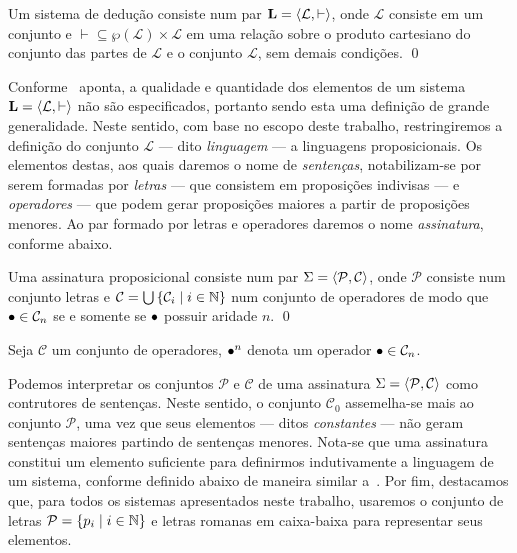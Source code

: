 \begin{definition}[Sistema]
    Um sistema de dedução consiste num par $\mathbf{L} = \langle\mathcal{L}, \vdash\rangle$, onde $\mathcal{L}$ consiste em um conjunto e ${\vdash}\subseteq\wp(\mathcal{L})\times\mathcal{L}$ em uma relação sobre o produto cartesiano do conjunto das partes de $\mathcal{L}$ e o conjunto $\mathcal{L}$, sem demais condições.
    \qed{}
\end{definition}

Conforme~\cite{Beziau} aponta, a qualidade e quantidade dos elementos de um sistema $\mathbf{L}=\langle\mathcal{L}, \vdash\rangle$ não são especificados, portanto sendo esta uma definição de grande generalidade. Neste sentido, com base no escopo deste trabalho, restringiremos a definição do conjunto $\mathcal{L}$ --- dito \emph{linguagem} --- a linguagens proposicionais. Os elementos destas, aos quais daremos o nome de \emph{sentenças}, notabilizam-se por serem formadas por \emph{letras} --- que consistem em proposições indivisas --- e \emph{operadores} --- que podem gerar proposições maiores a partir de proposições menores. Ao par formado por letras e operadores daremos o nome \emph{assinatura}, conforme abaixo.

\begin{definition}[Assinatura]
    Uma assinatura proposicional consiste num par $\Sigma=\langle\mathcal{P},\mathcal{C}\rangle$, onde $\mathcal{P}$ consiste num conjunto letras e $\mathcal{C}=\bigcup\left\{\mathcal{C}_i\mid i\in\mathbb{N}\right\}$ num conjunto de operadores de modo que $\mathalpha{\bullet}\in\mathcal{C}_n$ se e somente se $\mathalpha{\bullet}$ possuir aridade $n$.
    \qed{}
\end{definition}

\begin{notation}
    Seja $\mathcal{C}$ um conjunto de operadores, $\mathalpha{\bullet}^n$ denota um operador $\mathalpha{\bullet}\in\mathcal{C}_n$.
\end{notation}

Podemos interpretar os conjuntos $\mathcal{P}$ e $\mathcal{C}$ de uma assinatura $\Sigma=\langle\mathcal{P},\mathcal{C}\rangle$ como contrutores de sentenças.
Neste sentido, o conjunto $\mathcal{C}_0$ assemelha-se mais ao conjunto $\mathcal{P}$, uma vez que seus elementos --- ditos \emph{constantes} --- não geram sentenças maiores partindo de sentenças menores.
Nota-se que uma assinatura constitui um elemento suficiente para definirmos indutivamente a linguagem de um sistema, conforme definido abaixo de maneira similar a~\cite{Franks}.
Por fim, destacamos que, para todos os sistemas apresentados neste trabalho, usaremos o conjunto de letras $\mathcal{P}=\left\{p_i\mid i\in\mathbb{N}\right\}$ e letras romanas em caixa-baixa para representar seus elementos.

